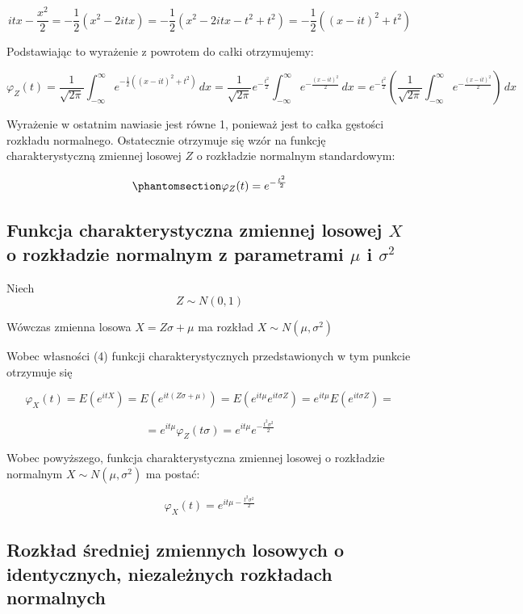 \documentclass[
  letterpaper,
  DIV=11,
  numbers=noendperiod]{scrreprt}
\begin{document}
\[ itx-\frac{x^2}{2}  = -\frac{1}{2}\left(x^2 - 2itx\right) = -\frac{1}{2}\left(x^2 - 2itx - t^2 + t^2\right) = -\frac{1}{2}\left((x - it)^2 + t^2\right)\]

Podstawiając to wyrażenie z powrotem do całki otrzymujemy:

\[
\varphi_Z(t) = \frac{1}{\sqrt{2\pi}} \int_{-\infty}^{\infty} e^{-\frac{1}{2}\left((x - it)^2 + t^2\right)} \, dx = \frac{1}{\sqrt{2\pi}} e^{-\frac{t^2}{2}} \int_{-\infty}^{\infty} e^{-\frac{(x - it)^2}{2}} \, dx = 
e^{-\frac{t^2}{2}} \left( \frac{1}{\sqrt{2\pi}}  \int_{-\infty}^{\infty} e^{-\frac{(x - it)^2}{2}} \right) \, dx
\]

Wyrażenie w ostatnim nawiasie jest równe 1, ponieważ jest to całka
gęstości rozkładu normalnego. Ostatecznie otrzymuje się wzór na funkcję
charakterystyczną zmiennej losowej \(Z\) o rozkładzie normalnym
standardowym:

\begin{equation}\phantomsection\label{eq-fun_char_nor_s}{\varphi_Z(t) = e^{-\frac{t^2}{2}}}\end{equation}

\subsection{\texorpdfstring{Funkcja charakterystyczna zmiennej losowej
\(X\) o rozkładzie normalnym z parametrami \(\mu\) i
\(\sigma^2\)}{Funkcja charakterystyczna zmiennej losowej X o rozkładzie normalnym z parametrami \textbackslash mu i \textbackslash sigma\^{}2}}\label{funkcja-charakterystyczna-zmiennej-losowej-x-o-rozkux142adzie-normalnym-z-parametrami-mu-i-sigma2}

Niech \[Z \sim N(0,1)\]

Wówczas zmienna losowa \(X=Z\sigma+\mu\) ma rozkład
\(X \sim N( \mu,\sigma^2)\)

Wobec własności (4) funkcji charakterystycznych przedstawionych w tym
punkcie otrzymuje się

\[ \varphi_X(t)= E(e^{itX}) =E(e^{it(Z\sigma+\mu)}) = E(e^{it\mu} e^{it\sigma Z})=e^{it\mu}E( e^{it\sigma Z})=\]

\[=e^{it\mu} \varphi_Z(t\sigma)= e^{it\mu} e^{-\frac{t^2\sigma^2}{2}}\]

Wobec powyższego, funkcja charakterystyczna zmiennej losowej o
rozkładzie normalnym \(X \sim N(\mu,\sigma^2)\) ma postać:

\[ \varphi_X(t)=e^{it\mu-\frac{t^2\sigma^2}{2}} \]

\subsection{Rozkład średniej zmiennych losowych o identycznych,
niezależnych rozkładach
normalnych}\label{rozkux142ad-ux15bredniej-zmiennych-losowych-o-identycznych-niezaleux17cnych-rozkux142adach-normalnych}
\end{document}
